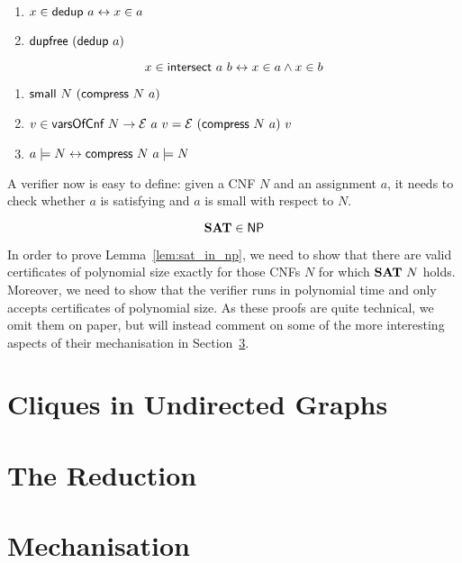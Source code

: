 \begin{proposition}\leavevmode
  \begin{enumerate}
    \item $x \in \textsf{dedup}~a \leftrightarrow x \in a$
    \item $\textsf{dupfree}~(\textsf{dedup}~a)$
  \end{enumerate}
\end{proposition}

\begin{proposition}
  \[x \in \textsf{intersect}~a~b \leftrightarrow x \in a \land x \in b \]
\end{proposition}

\begin{lemma}\leavevmode
  \begin{enumerate}
    \item $\textsf{small}~N~(\textsf{compress}~N~a)$
    \item $v \in \textsf{varsOfCnf}~N \rightarrow \mathcal{E}~a~v = \mathcal{E}~(\textsf{compress}~N~a)~v$
    \item $a \models N \leftrightarrow \textsf{compress}~N~a \models N$
  \end{enumerate}
\end{lemma}

A verifier now is easy to define: given a CNF $N$ and an assignment $a$, it needs to check whether $a$ is satisfying and $a$ is small with respect to $N$. 

\begin{lemma}[\SAT{} is in \NP{}]\label{lem:sat_in_np}
  \[\textbf{SAT}{} \in \textsf{NP}{} \]
\end{lemma}

In order to prove Lemma~\ref{lem:sat_in_np}, we need to show that there are valid certificates of polynomial size exactly for those CNFs $N$ for which $\textbf{SAT}{}~N$ holds. 
Moreover, we need to show that the verifier runs in polynomial time and only accepts certificates of polynomial size. 
As these proofs are quite technical, we omit them on paper, but will instead comment on some of the more interesting aspects of their mechanisation in Section~\ref{sec:technical_mechanisation}.

\section{Cliques in Undirected Graphs}

\section{The Reduction}

\section{Mechanisation}\label{sec:technical_mechanisation}
